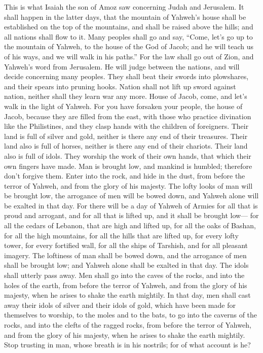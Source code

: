  This is what Isaiah the son of Amoz saw concerning Judah
and Jerusalem.  It shall happen in the latter days, that
the mountain of Yahweh's house shall be established on the top of the
mountains, and shall be raised above the hills; and all nations shall
flow to it.  Many peoples shall go and say, ``Come, let's
go up to the mountain of Yahweh, to the house of the God of Jacob; and
he will teach us of his ways, and we will walk in his paths.'' For the
law shall go out of Zion, and Yahweh's word from Jerusalem.
 He will judge between the nations, and will decide
concerning many peoples. They shall beat their swords into plowshares,
and their spears into pruning hooks. Nation shall not lift up sword
against nation, neither shall they learn war any more. 
House of Jacob, come, and let's walk in the light of Yahweh.
 For you have forsaken your people, the house of Jacob,
because they are filled from the east, with those who practice
divination like the Philistines, and they clasp hands with the children
of foreigners.  Their land is full of silver and gold,
neither is there any end of their treasures. Their land also is full of
horses, neither is there any end of their chariots.  Their
land also is full of idols. They worship the work of their own hands,
that which their own fingers have made.  Man is brought
low, and mankind is humbled; therefore don't forgive them.
 Enter into the rock, and hide in the dust, from before
the terror of Yahweh, and from the glory of his majesty. 
The lofty looks of man will be brought low, the arrogance of men will be
bowed down, and Yahweh alone will be exalted in that day.
 For there will be a day of Yahweh of Armies for all that
is proud and arrogant, and for all that is lifted up, and it shall be
brought low---  for all the cedars of Lebanon, that are
high and lifted up, for all the oaks of Bashan,  for all
the high mountains, for all the hills that are lifted up,
 for every lofty tower, for every fortified wall,
 for all the ships of Tarshish, and for all pleasant
imagery.  The loftiness of man shall be bowed down, and
the arrogance of men shall be brought low; and Yahweh alone shall be
exalted in that day.  The idols shall utterly pass away.
 Men shall go into the caves of the rocks, and into the
holes of the earth, from before the terror of Yahweh, and from the glory
of his majesty, when he arises to shake the earth mightily.
 In that day, men shall cast away their idols of silver
and their idols of gold, which have been made for themselves to worship,
to the moles and to the bats,  to go into the caverns of
the rocks, and into the clefts of the ragged rocks, from before the
terror of Yahweh, and from the glory of his majesty, when he arises to
shake the earth mightily.  Stop trusting in man, whose
breath is in his nostrils; for of what account is he?


